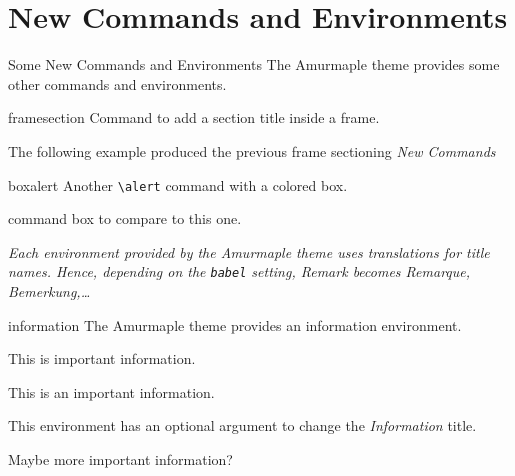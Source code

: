 \documentclass[10pt,aspectratio=169,english]{beamer}
\begin{document}

\section{New Commands and Environments}

\begin{frame}{Some New Commands and Environments}
  The Amurmaple theme provides some other commands and environments.


  \begin{docCommand}{framesection}{}
    Command to add a section title inside a frame.

    The following example produced the previous frame sectioning \emph{New Commands}
    \begin{Code}
\end{Code}
\end{docCommand}
\begin{docCommand}{boxalert}{}
Another \lstinline+\alert+ command with a colored box.
  \begin{Exemple}
 command box to compare to \alert{this one}.
  \end{Exemple}
\end{docCommand}
\framebreak

{\itshape {} Each environment provided by the Amurmaple theme uses
translations for title names. Hence, depending on the \texttt{babel} setting,
\emph{Remark} becomes \emph{Remarque, Bemerkung,}\dots}

\begin{docEnvironment}{information}{}
 The Amurmaple theme provides an information environment.\label{sl:information}
  \begin{Code}
\begin{information}
  This is important information.
\end{information}
  \end{Code}
  \begin{information}
    This is an important information.
  \end{information}

  This environment has an optional argument to change the \emph{Information}
  title.
  \begin{Code}
\begin{information}
  Maybe more important information?
\end{information}
\end{Code}


\end{docEnvironment}
\end{frame}
\end{document}
